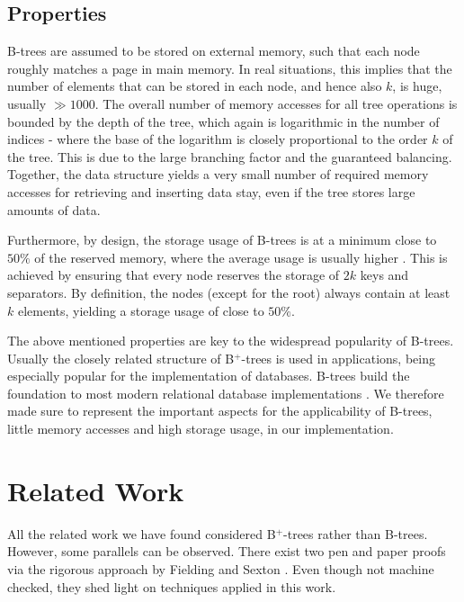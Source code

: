 \subsection{Properties}

B-trees are assumed to be stored on external memory,
such that each node roughly matches a page in main memory.
In real situations, this implies that the number of elements
that can be stored in each node, and hence also $k$, is huge, usually $\gg 1000$.
The overall number of memory accesses for all tree operations
is bounded by the depth of the tree,
which again is logarithmic in the number of indices -
where the base of the logarithm is closely proportional to the order $k$ of the tree.
This is due to the large branching factor and the guaranteed balancing.
Together, the data structure yields a very small number of required memory accesses
for retrieving and inserting data stay,
even if the tree stores large amounts of data.

Furthermore, by design, the storage usage of B-trees is at a minimum close to $50\%$
of the reserved memory,
where the average usage is usually higher \parencite{DBLP:journals/acta/BayerM72}.
This is achieved by ensuring that every node reserves the storage of $2k$ keys and separators.
By definition, the nodes (except for the root) always contain
at least $k$ elements, yielding a storage usage of close to $50\%$.

The above mentioned properties are key to the widespread popularity of B-trees.
Usually the closely related structure of B$^+$-trees is used in applications,
being especially popular for the implementation of databases.
B-trees build the foundation to most modern relational database implementations \parencite{DBLP:journals/csur/Comer79}.
We therefore made sure to represent the important aspects for the applicability
of B-trees, little memory accesses and high storage usage, in our implementation.

\section{Related Work}

All the related work we have found considered B$^+$-trees
rather than B-trees.
However, some parallels can be observed.
There exist two pen and paper proofs via the rigorous approach
by Fielding \parencite{Fielding80} and Sexton \parencite{DBLP:journals/entcs/SextonT08}.
Even though not machine checked, they shed light on techniques applied in this work.

